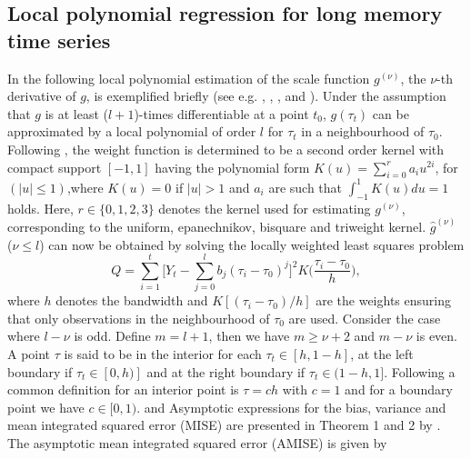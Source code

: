 \documentclass[12pt]{article}
\begin{document}

\subsection{Local polynomial regression for long memory time series}
In the following local polynomial estimation of the scale function $g^{(\nu)}$, the $\nu$-th derivative of $g$, is exemplified briefly (see e.g. \cite{beran2002iterative}, \cite{beran2002local}, \cite{beran2002semifar}, and \cite{beran2013limit}). Under the assumption that $g$ is at least ($l+1$)-times differentiable at a point $t_0$, $g(\tau_t)$ can be approximated by a local polynomial of order $l$ for $\tau_t$ in a neighbourhood of $\tau_0$. Following \citet{gasser1979kernel}, the weight function is determined to be a second order kernel with compact support $[-1,1]$ having the polynomial form $K(u)=\sum_{i=0}^{r}a_i u^{2i}$, for $(|u|\leq1)$,where $K(u)=0$ if $|u|>1$ and $a_i$ are such that $\int_{-1}^{1}K(u)du=1$ holds.  Here, $r \in \{0,1,2,3\}$ denotes the kernel used for estimating $g^{(\nu)}$, corresponding to the uniform, epanechnikov, bisquare and triweight kernel.
$\hat{g}^{(\nu)}$ ($\nu\leq l$) can now be obtained by solving the locally weighted least squares problem
\begin{equation}
\label{LP}
Q=\sum_{i=1}^{t}\Bigg[Y_t-\sum_{j=0}^{l}b_j(\tau_i-\tau_0)^j\Bigg]^2 K\Big(\frac{\tau_i-\tau_0}{h}\Big),	
\end{equation}
where $h$ denotes the bandwidth and $K[(\tau_i-\tau_0)/h]$ are the weights ensuring that only observations in the neighbourhood of $\tau_0$ are used. Consider the case where $l-\nu$ is odd. Define $m=l+1$, then we have $m \geq \nu + 2$ and $m-\nu$ is even. A point $\tau$ is said to be in the interior for each $\tau_t\in [h,1-h]$, at the left boundary if $\tau_t\in [0,h)]$ and at the right boundary if $\tau_t\in (1-h,1]$. Following \citet{beran2002local} a common definition for an interior point is $\tau=ch$ with $c=1$ and for a boundary point we have $c \in [0,1)$.   
\citet{beran2002iterative} and \citet{beran2002local}  Asymptotic expressions for the bias, variance and mean integrated squared error (MISE) are presented in Theorem 1 and 2 by \citet{beran2002local}. The asymptotic mean integrated squared error (AMISE) is given by
\end{document}
